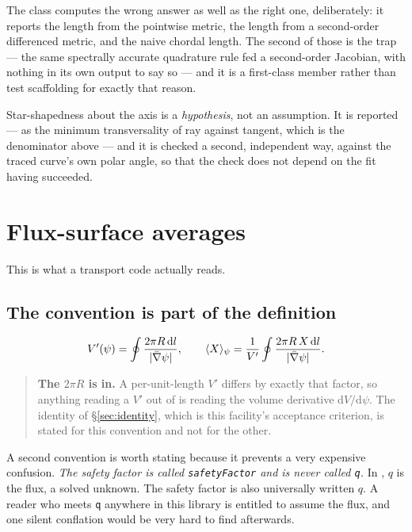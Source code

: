 The class computes the wrong answer as well as the right one, deliberately: it
reports the length from the pointwise metric, the length from a second-order
differenced metric, and the naive chordal length. The second of those is the trap
--- the same spectrally accurate quadrature rule fed a second-order Jacobian,
with nothing in its own output to say so --- and it is a first-class member
rather than test scaffolding for exactly that reason.

Star-shapedness about the axis is a \emph{hypothesis}, not an assumption. It is
reported --- as the minimum transversality of ray against tangent, which is the
denominator above --- and it is checked a second, independent way, against the
traced curve's own polar angle, so that the check does not depend on the fit
having succeeded.

\section{Flux-surface averages}

This is what a transport code actually reads.

\subsection{The convention is part of the definition}
\begin{equation}
	V'(\psi) = \oint \frac{2\pi R\,\mathrm{d}l}{|\bar{\nabla}\psi|},
	\qquad
	\langle X \rangle_\psi = \frac{1}{V'}
		\oint \frac{2\pi R\, X\,\mathrm{d}l}{|\bar{\nabla}\psi|}.
	\label{eq:fsa}
\end{equation}

\begin{quote}
	\textbf{The $2\pi R$ is in.} A per-unit-length $V'$ differs by exactly that
	factor, so anything reading a $V'$ out of {\meq} is reading the volume
	derivative $\mathrm{d}V/\mathrm{d}\psi$. The identity of
	\S\ref{sec:identity}, which is this facility's acceptance criterion, is
	stated for this convention and not for the other.
\end{quote}

A second convention is worth stating because it prevents a very expensive
confusion. \emph{The safety factor is called \texttt{safetyFactor} and is never
called \texttt{q}.} In {\meq}, $q$ is the flux, a solved unknown. The safety
factor is also universally written $q$. A reader who meets \texttt{q} anywhere in
this library is entitled to assume the flux, and one silent conflation would be
very hard to find afterwards.

